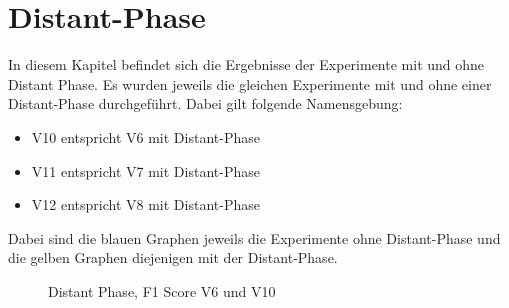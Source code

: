 
\section{Distant-Phase}
In diesem Kapitel befindet sich die Ergebnisse der Experimente mit und ohne Distant Phase. Es wurden jeweils die gleichen Experimente mit und ohne einer Distant-Phase durchgeführt. Dabei gilt folgende Namensgebung:
\begin{itemize}  
	\item V10 entspricht V6 mit Distant-Phase
	\item V11 entspricht V7 mit Distant-Phase
	\item V12 entspricht V8 mit Distant-Phase
\end{itemize}
Dabei sind die blauen Graphen jeweils die Experimente ohne Distant-Phase und die gelben Graphen diejenigen mit der Distant-Phase.

\begin{figure}[H]
	\centering
	\caption{Distant Phase, F1 Score V6 und V10}
	\label{fig:Results V6 und V10}
\end{figure}

